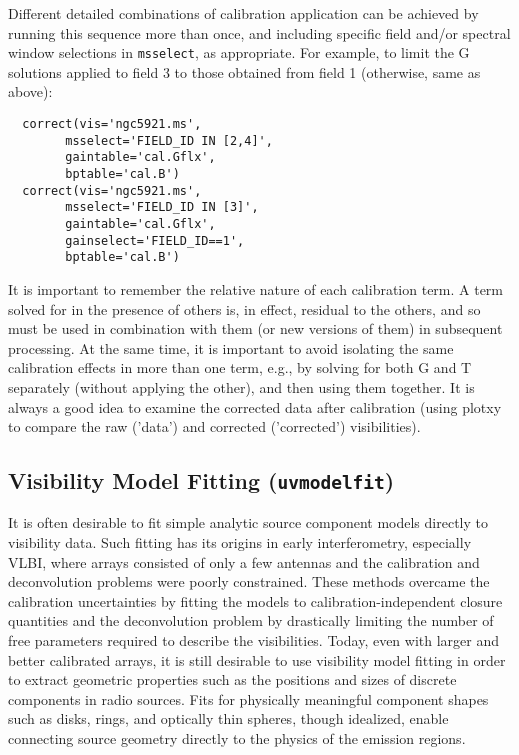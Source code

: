 Different detailed combinations of calibration application can be
achieved by running this sequence more than once, and including
specific field and/or spectral window selections in {\tt msselect}, as
appropriate.  For example, to limit the G solutions applied to field 3
to those obtained from field 1 (otherwise, same as above):

\small
\begin{verbatim}
  correct(vis='ngc5921.ms',
        msselect='FIELD_ID IN [2,4]',
        gaintable='cal.Gflx',
        bptable='cal.B')
  correct(vis='ngc5921.ms',
        msselect='FIELD_ID IN [3]',
        gaintable='cal.Gflx',
        gainselect='FIELD_ID==1',
        bptable='cal.B')
\end{verbatim}
\normalsize


It is important to remember the relative nature of each calibration
term.  A term solved for in the presence of others is, in effect,
residual to the others, and so must be used in combination with them
(or new versions of them) in subsequent processing.  At the same time,
it is important to avoid isolating the same calibration effects in
more than one term, e.g., by solving for both G and T separately
(without applying the other), and then using them together.  It is
always a good idea to examine the corrected data after calibration
(using plotxy to compare the raw ('data') and corrected ('corrected')
visibilities).

\subsection{Visibility Model Fitting ({\tt uvmodelfit})}
\label{subsection:synth.uvmodelfit}

It is often desirable to fit simple analytic source component models
directly to visibility data.  Such fitting has its origins in early
interferometry, especially VLBI, where arrays consisted of only a few
antennas and the calibration and deconvolution problems were poorly
constrained.  These methods overcame the calibration uncertainties by
fitting the models to calibration-independent closure quantities and
the deconvolution problem by drastically limiting the number of free
parameters required to describe the visibilities.  Today, even with
larger and better calibrated arrays, it is still desirable to use
visibility model fitting in order to extract geometric properties such
as the positions and sizes of discrete components in radio sources.
Fits for physically meaningful component shapes such as disks, rings,
and optically thin spheres, though idealized, enable connecting source
geometry directly to the physics of the emission regions.

